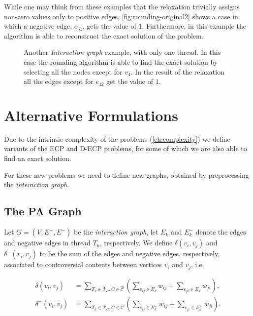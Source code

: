 While one may think from these examples that the relaxation trivially assigns
non-zero values only to positive edges, \autoref{fig:rounding-original2} shows
a case in which a negative edge, $e_{31}$, gets the value of $1$. Furthermore,
in this example the algorithm is able to reconstruct the exact solution of the problem.

\begin{figure}
	\centering
	\caption[Example of rounding algorithm finding the exact solution]{Another
		\emph{Interaction graph} example, with only one thread. In
		this case the rounding algorithm is able to find the exact solution by
		selecting all the nodes except for $v_4$. In the result of the
		relaxation all the edges except for $e_{42}$ get the value of $1$.}%
	\label{fig:rounding-original2}
\end{figure}

\section{Alternative Formulations}%
\label{sec:alternative-formulations}

Due to the intrinsic complexity of the problems
(\autoref{ch:complexity}) we define variants of
the \acrshort{ECP} and \acrshort{D-ECP} problems, for some of which we are also able to find an exact solution.

For these new problems we need to define new graphs, obtained by preprocessing
the \emph{interaction graph}.

\subsection{The \acrlong{PA} Graph}%
\label{sub:pa-graph}

Let $G = (V, E^{+}, E^{-})$ be the \emph{interaction graph}, let $E_k$ and
$E^-_k$ denote the edges and negative edges in thread $T_k$,
respectively. We define $\delta(v_{i}, v_{j})$ and
$\delta^{-} (v_{i}, v_{j})$ to be the sum of the edges and negative edges, respectively,
associated to controversial contents between vertices $v_{i} $ and $v_{j}
$, i.e.\

\begin{align}
	\label{eq:}
	\delta(v_{i}, v_{j})   & = \sum^{}_{T_k \in \mathcal{T}_C, C \in
	\mathcal{\hat{C}} } ( \sum^{}_{e_{ij} \in E_k} w_{ij} + \sum^{}_{e_{ji} \in
	E_k} w_{ji} ),
	\\
	\delta^-(v_{i}, v_{j}) & = \sum^{}_{T_k \in \mathcal{T}_C, C \in
	\mathcal{\hat{C}} } ( \sum^{}_{e_{ij} \in E^-_k} w_{ij} + \sum^{}_{e_{ji} \in
	E^-_k} w_{ji} ).
\end{align}

